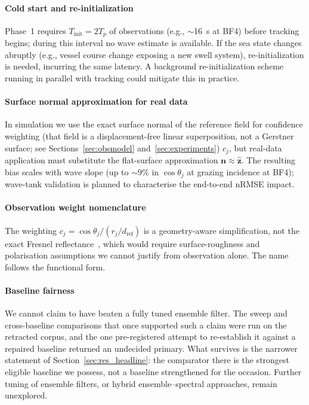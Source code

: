 \documentclass[review]{elsarticle}
\begin{document}
\paragraph{Cold start and re-initialization}
Phase~1 requires
$T_{\text{init}} = 2T_p$ of observations (e.g., $\sim$16~s at BF4)
before tracking begins; during this interval no wave estimate is
available.  If the sea state changes abruptly (e.g., vessel course
change exposing a new swell system), re-initialization is needed,
incurring the same latency.  A background re-initialization scheme
running in parallel with tracking could mitigate this in practice.

\paragraph{Surface normal approximation for real data}
In simulation
we use the exact surface normal of the reference field for confidence weighting
(that field is a displacement-free linear superposition, not a Gerstner surface;
see Sections~\ref{sec:obsmodel} and~\ref{sec:experiments})
$c_j$, but real-data application must substitute the flat-surface
approximation $\mathbf{n}\approx\hat{\mathbf{z}}$.  The resulting
bias scales with wave slope (up to ${\sim}9\%$ in $\cos\theta_j$
at grazing incidence at BF4); wave-tank validation is planned to
characterise the end-to-end nRMSE impact.

\paragraph{Observation weight nomenclature}
The weighting $c_j = \cos\theta_j/(r_j/d_{\text{ref}})$ is a geometry-aware
simplification, not the exact Fresnel reflectance~\citep{born1999}, which would
require surface-roughness and polarisation assumptions we cannot justify from
observation alone. The name follows the functional form.

\paragraph{Baseline fairness}
We cannot claim to have beaten a fully tuned ensemble
filter. The sweep and cross-baseline comparisons that once supported such a claim
were run on the retracted corpus, and the one pre-registered attempt to re-establish
it against a repaired baseline returned an undecided primary. What survives is the
narrower statement of Section~\ref{sec:res_headline}: the comparator there is the
strongest eligible baseline we possess, not a baseline strengthened for the
occasion. Further tuning of ensemble filters, or hybrid ensemble--spectral
approaches, remain unexplored.
\end{document}
